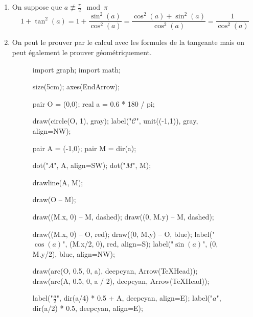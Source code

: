 \begin{prv}
	\begin{enumerate}
		\item On suppose que $a\not\equiv \frac{\pi}{2}\mod\pi$\\
			\[
				1+\tan^2(a) = 1+\frac{\sin^2(a)}{\cos^2(a)} = \frac{\cos^2(a) + \sin^2(a)}{\cos^2(a)} = \frac{1}{\cos^2(a)}
			\]
		\item 
			On peut le prouver par le calcul avec les formules de la tangeante mais on peut également le prouver géométriquement.\\
			\begin{figure}[H]
				\centering
				\begin{asy}
					import graph;
					import math;

					size(5cm);
					axes(EndArrow);

					pair O = (0,0);
					real a = 0.6 * 180 / pi;

					draw(circle(O, 1), gray);
					label("$\mathcal{C}$", unit((-1,1)), gray, align=NW);

					pair A = (-1,0);
					pair M = dir(a);

					dot("$A$", A, align=SW);
					dot("$M$", M);

					drawline(A, M);
					
					draw(O -- M);

					draw((M.x, 0) -- M, dashed);
					draw((0, M.y) -- M, dashed);

					draw((M.x, 0) -- O, red);
					draw((0, M.y) -- O, blue);
					label("$\cos(a)$", (M.x/2, 0), red, align=S);
					label("$\sin(a)$", (0, M.y/2), blue, align=NW);
					
					draw(arc(O, 0.5, 0, a), deepcyan, Arrow(TeXHead));
					draw(arc(A, 0.5, 0, a / 2), deepcyan, Arrow(TeXHead));

					label("$\frac{a}{2}$", dir(a/4) * 0.5 + A, deepcyan, align=E);
					label("$a$", dir(a/2) * 0.5, deepcyan, align=E);


\end{asy}
\end{figure}
\end{enumerate}
\end{prv}
